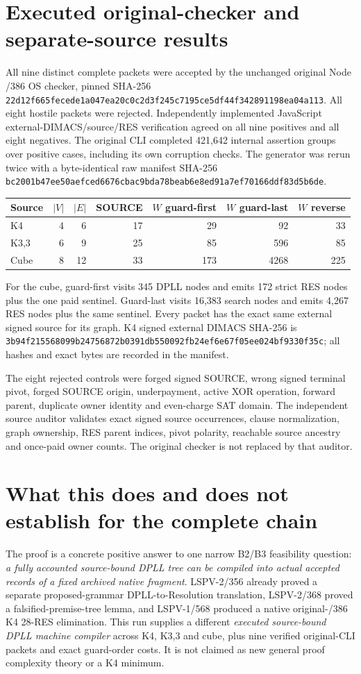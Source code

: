 \documentclass[11pt]{article}
\begin{document}
\section*{Executed original-checker and separate-source results}
All nine distinct complete packets were accepted by the unchanged original Node /386 OS checker, pinned SHA-256 \texttt{22d12f665fecede1a047ea20c0c2d3f245c7195ce5df44f342891198ea04a113}. All eight hostile packets were rejected. Independently implemented JavaScript external-DIMACS/source/RES verification agreed on all nine positives and all eight negatives. The original CLI completed 421,642 internal assertion groups over positive cases, including its own corruption checks. The generator was rerun twice with a byte-identical raw manifest SHA-256 \texttt{bc2001b47ee50aefced6676cbac9bda78beab6e8ed91a7ef70166ddf83d5b6de}.

\begin{center}\begin{tabular}{lrrrrrr}\toprule
Source & $|V|$ & $|E|$ & SOURCE & $W$ guard-first & $W$ guard-last & $W$ reverse \\
\midrule
K4 &4&6&17&29&92&33\\
K3,3 &6&9&25&85&596&85\\
Cube &8&12&33&173&4268&225\\
\bottomrule
\end{tabular}\end{center}
For the cube, guard-first visits 345 DPLL nodes and emits 172 strict RES nodes plus the one paid sentinel. Guard-last visits 16,383 search nodes and emits 4,267 RES nodes plus the same sentinel. Every packet has the exact same external signed source for its graph. K4 signed external DIMACS SHA-256 is \texttt{3b94f215568099b24756872b0391db550092fb24ef6e67f05ee024bf9330f35c}; all hashes and exact bytes are recorded in the manifest.

The eight rejected controls were forged signed SOURCE, wrong signed terminal pivot, forged SOURCE origin, underpayment, active XOR operation, forward parent, duplicate owner identity and even-charge SAT domain. The independent source auditor validates exact signed source occurrences, clause normalization, graph ownership, RES parent indices, pivot polarity, reachable source ancestry and once-paid owner counts. The original checker is not replaced by that auditor.

\section*{What this does and does not establish for the complete chain}
The proof is a concrete positive answer to one narrow B2/B3 feasibility question: \emph{a fully accounted source-bound DPLL tree can be compiled into actual accepted records of a fixed archived native fragment}. LSPV-2/356 already proved a separate proposed-grammar DPLL-to-Resolution translation, LSPV-2/368 proved a falsified-premise-tree lemma, and LSPV-1/568 produced a native original-/386 K4 28-RES elimination. This run supplies a different \emph{executed source-bound DPLL machine compiler} across K4, K3,3 and cube, plus nine verified original-CLI packets and exact guard-order costs. It is not claimed as new general proof complexity theory or a K4 minimum.
\end{document}

